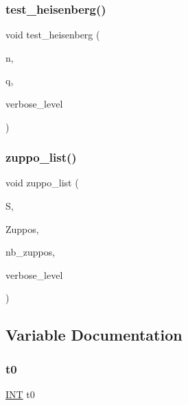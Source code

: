 \subsubsection{\texorpdfstring{test\+\_\+heisenberg()}{test\_heisenberg()}}
{\footnotesize\ttfamily void test\+\_\+heisenberg (\begin{DoxyParamCaption}\item[{\mbox{\hyperlink{galois_8h_a09fddde158a3a20bd2dcadb609de11dc}{I\+NT}}}]{n,  }\item[{\mbox{\hyperlink{galois_8h_a09fddde158a3a20bd2dcadb609de11dc}{I\+NT}}}]{q,  }\item[{\mbox{\hyperlink{galois_8h_a09fddde158a3a20bd2dcadb609de11dc}{I\+NT}}}]{verbose\+\_\+level }\end{DoxyParamCaption})}

\mbox{\label{tao_8_c_a290fcabb3c135982f9302fa564486b3b}} 
\subsubsection{\texorpdfstring{zuppo\+\_\+list()}{zuppo\_list()}}
{\footnotesize\ttfamily void zuppo\+\_\+list (\begin{DoxyParamCaption}\item[{\mbox{\hyperlink{classsims}{sims}} $\ast$}]{S,  }\item[{\mbox{\hyperlink{galois_8h_a09fddde158a3a20bd2dcadb609de11dc}{I\+NT}} $\ast$}]{Zuppos,  }\item[{\mbox{\hyperlink{galois_8h_a09fddde158a3a20bd2dcadb609de11dc}{I\+NT}} \&}]{nb\+\_\+zuppos,  }\item[{\mbox{\hyperlink{galois_8h_a09fddde158a3a20bd2dcadb609de11dc}{I\+NT}}}]{verbose\+\_\+level }\end{DoxyParamCaption})}



\subsection{Variable Documentation}
\mbox{\label{tao_8_c_a4268f4fe222ffb119218a0199f5e1904}} 
\subsubsection{\texorpdfstring{t0}{t0}}
{\footnotesize\ttfamily \mbox{\hyperlink{galois_8h_a09fddde158a3a20bd2dcadb609de11dc}{I\+NT}} t0}

